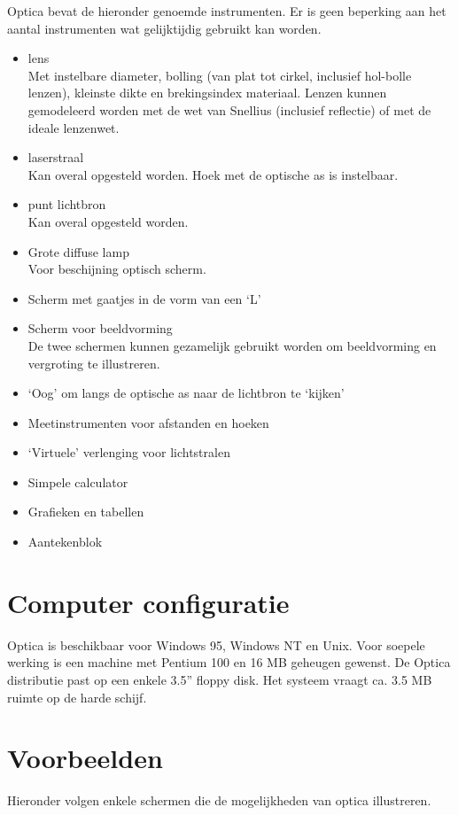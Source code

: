 \documentclass[11pt,twocolumn]{article}
\newcommand{\tick}[1]{\item #1\hfill\\}
\begin{document}
Optica bevat de hieronder genoemde instrumenten.  Er is geen beperking
aan het aantal instrumenten wat gelijktijdig gebruikt kan worden.

\begin{itemize}
    \setlength{\itemsep}{0pt}
    \tick{lens}
Met instelbare diameter, bolling (van plat tot cirkel, inclusief
hol-bolle lenzen), kleinste dikte en brekingsindex materiaal.  Lenzen
kunnen gemodeleerd worden met de wet van Snellius (inclusief
reflectie) of met de ideale lenzenwet.

    \tick{laserstraal}
Kan overal opgesteld worden.  Hoek met de optische as is instelbaar.

    \tick{punt lichtbron}
Kan overal opgesteld worden.

    \tick{Grote diffuse lamp}
Voor beschijning optisch scherm.

    \item{Scherm met gaatjes in de vorm van een `L'}
    \tick{Scherm voor beeldvorming}
De twee schermen kunnen gezamelijk gebruikt worden om beeldvorming en
vergroting te illustreren.  
    \item{`Oog' om langs de optische as naar de lichtbron te `kijken'}
    \item{Meetinstrumenten voor afstanden en hoeken}
    \item{`Virtuele' verlenging voor lichtstralen}
    \item{Simpele calculator}
    \item{Grafieken en tabellen}
    \item{Aantekenblok}
\end{itemize}


\section*{Computer configuratie}

Optica is beschikbaar voor Windows 95, Windows NT en Unix. Voor soepele
werking is een machine met Pentium 100 en 16 MB geheugen gewenst. De
Optica distributie past op een enkele 3.5'' floppy disk. Het systeem
vraagt ca. 3.5 MB ruimte op de harde schijf.


\section*{Voorbeelden}

Hieronder volgen enkele schermen die de mogelijkheden van optica
illustreren.




\end{document}
